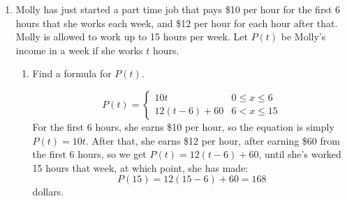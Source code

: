 \documentclass{article}
\begin{document}
\begin{enumerate}
\begin{enumerate}
    \begin{solution}
      No, the function is not continuous on its domain. We cannot draw the graph without
      picking up our pencil.
    \end{solution}

  \item
    \begin{problem}[\vfill\newpage]
      Write a formula for $C(w)$. 
    \end{problem}

    \begin{solution}
      We can write a piecewise formula.
      \[C(w)=
      \begin{cases}
        0.63 &\text{when } 0 < w \leq 1 \\
        0.87 &\text{when } 1 < w \leq 2 \\
        1.11 &\text{when } 2 < w \leq 3 \\
        1.35 &\text{when } 3 < w \leq 3.5
      \end{cases}
      \]
    \end{solution}

  \end{enumerate}

  \item 


  Molly has just started a part time job that pays \$10 per hour for the first 6 hours that she works each week, and \$12 per hour for each hour after that. Molly is allowed to work up to 15 hours per week. Let $P(t)$ be Molly's income in a week if she works $t$ hours. 

  \begin{enumerate}

  \item
    \begin{problem}[\vfill]
      Find a formula for $P(t)$.
    \end{problem}

    \begin{solution}
      \[
        P(t)=
        \begin{cases}
          10t & 0 \leq x \leq 6\\
          12(t-6)+60& 6< x \leq 15  
        \end{cases}
      \]For the first 6 hours, she earns \$10 per hour, so the equation is simply $P(t) = 10t$. After that, she earns \$12 per hour, after earning \$60 from the first 6 hours, so we get $P(t) = 12(t-6) + 60$, until she's worked 15 hours that week, at which point, she has made:
      $$P(15) = 12(15-6) + 60 = 168$$
      dollars.
    \end{solution}


\end{enumerate}
\end{enumerate}
\end{document}
